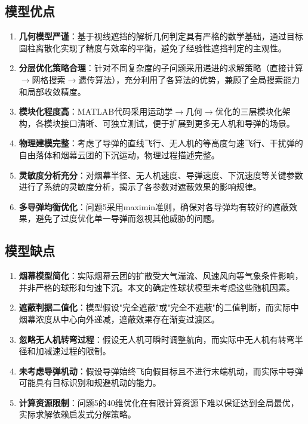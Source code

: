 
\subsection{模型优点}

\begin{enumerate}[label=(\arabic*)]
    \item \textbf{几何模型严谨}：基于视线遮挡的解析几何判定具有严格的数学基础，通过目标圆柱离散化实现了精度与效率的平衡，避免了经验性遮挡判定的主观性。

    \item \textbf{分层优化策略合理}：针对不同复杂度的子问题采用递进的求解策略（直接计算$\to$网格搜索$\to$遗传算法），充分利用了各算法的优势，兼顾了全局搜索能力和局部收敛精度。

    \item \textbf{模块化程度高}：MATLAB代码采用运动学$\to$几何$\to$优化的三层模块化架构，各模块接口清晰、可独立测试，便于扩展到更多无人机和导弹的场景。

    \item \textbf{物理建模完整}：考虑了导弹的直线飞行、无人机的等高度匀速飞行、干扰弹的自由落体和烟幕云团的下沉运动，物理过程描述完整。

    \item \textbf{灵敏度分析充分}：对烟幕半径、无人机速度、导弹速度、下沉速度等关键参数进行了系统的灵敏度分析，揭示了各参数对遮蔽效果的影响规律。

    \item \textbf{多导弹均衡优化}：问题5采用maximin准则，确保对各导弹均有较好的遮蔽效果，避免了过度优化单一导弹而忽视其他威胁的问题。
\end{enumerate}

\subsection{模型缺点}

\begin{enumerate}[label=(\arabic*)]
    \item \textbf{烟幕模型简化}：实际烟幕云团的扩散受大气湍流、风速风向等气象条件影响，并非严格的球形和匀速下沉。本文的确定性球状模型未考虑这些随机因素。

    \item \textbf{遮蔽判据二值化}：模型假设"完全遮蔽"或"完全不遮蔽"的二值判断，而实际中烟幕浓度从中心向外递减，遮蔽效果存在渐变过渡区。

    \item \textbf{忽略无人机转弯过程}：假设无人机可瞬时调整航向，而实际中无人机有转弯半径和加减速过程的限制。

    \item \textbf{未考虑导弹机动}：假设导弹始终飞向假目标且不进行末端机动，而实际中导弹可能具有目标识别和规避机动的能力。

    \item \textbf{计算资源限制}：问题5的40维优化在有限计算资源下难以保证达到全局最优，实际求解依赖启发式分解策略。
\end{enumerate}

